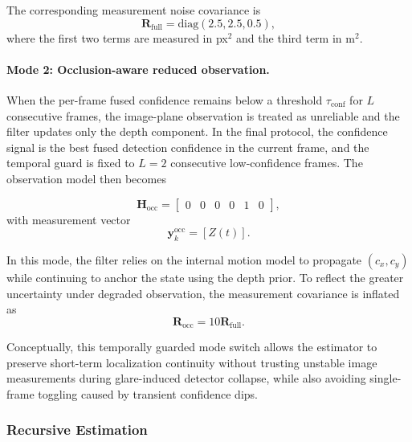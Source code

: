 \documentclass[pdflatex,sn-mathphys-num]{sn-jnl}%
\theoremstyle{thmstyleone}%
\theoremstyle{thmstyletwo}%
\theoremstyle{thmstylethree}%
\begin{document}
The corresponding measurement noise covariance is
\begin{equation}
\mathbf{R}_{\mathrm{full}} = \mathrm{diag}(2.5, 2.5, 0.5),
\label{eq:R_full}
\end{equation}
where the first two terms are measured in px$^2$ and the third term in m$^2$.

\paragraph{Mode 2: Occlusion-aware reduced observation.}
When the per-frame fused confidence remains below a threshold $\tau_{\mathrm{conf}}$ for $L$ consecutive frames, the image-plane observation is treated as unreliable and the filter updates only the depth component. In the final protocol, the confidence signal is the best fused detection confidence in the current frame, and the temporal guard is fixed to $L=2$ consecutive low-confidence frames. The observation model then becomes

\begin{equation}
\mathbf{H}_{\mathrm{occ}} =
\begin{bmatrix}
0 & 0 & 0 & 0 & 1 & 0
\end{bmatrix},
\label{eq:H_occ}
\end{equation}
with measurement vector
\begin{equation}
\mathbf{y}_k^{\mathrm{occ}} = [Z(t)].
\label{eq:y_occ}
\end{equation}

In this mode, the filter relies on the internal motion model to propagate $(c_x, c_y)$ while continuing to anchor the state using the depth prior. To reflect the greater uncertainty under degraded observation, the measurement covariance is inflated as
\begin{equation}
\mathbf{R}_{\mathrm{occ}} = 10 \mathbf{R}_{\mathrm{full}}.
\label{eq:R_occ}
\end{equation}

Conceptually, this temporally guarded mode switch allows the estimator to preserve short-term localization continuity without trusting unstable image measurements during glare-induced detector collapse, while also avoiding single-frame toggling caused by transient confidence dips.

\subsubsection{Recursive Estimation}
\end{document}

